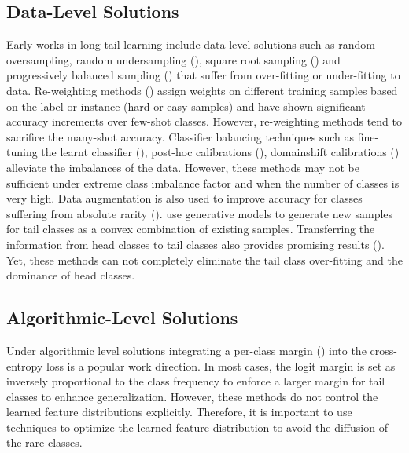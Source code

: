 \subsection{ Data-Level Solutions}Early works in long-tail learning include data-level solutions such as random oversampling, random undersampling (\cite{126}), %
square root sampling (\cite{root}) and progressively balanced sampling (\cite{kang2019decoupling}) that suffer from over-fitting or under-fitting to data. Re-weighting methods (\cite{cb,shu2019meta}) assign weights on different training samples based on the label or instance (hard or easy samples) and have shown significant accuracy increments over few-shot classes. However, re-weighting methods tend to sacrifice the many-shot accuracy. Classifier balancing techniques such as fine-tuning the learnt classifier (\cite{guerriero2018deepncm}), post-hoc calibrations (\cite{menon2020long,kang2019decoupling}), domainshift calibrations (\cite{peng2022optimal}) alleviate the imbalances of the data. However, these methods may not be sufficient under extreme class imbalance factor and when the number of classes is very high. Data augmentation is also used to improve accuracy for classes suffering from absolute rarity (\cite{150}). \cite{102} use generative models to generate new samples for tail classes as a convex combination of existing samples. Transferring the information from head classes to tail classes also provides promising results (\cite{100}). Yet, these methods can not completely eliminate the tail class over-fitting and the dominance of head classes. 

\subsection{Algorithmic-Level Solutions}
Under algorithmic level solutions integrating a per-class margin (\cite{menon2020long,metasoftmax}) into the cross-entropy loss is a popular work direction. In most cases, the logit margin is set as inversely proportional to the class frequency to enforce a larger margin for tail classes to enhance generalization. However, these methods do not control the learned feature distributions explicitly. Therefore, it is important to use techniques to optimize the learned feature distribution to avoid the diffusion of the rare classes. 

